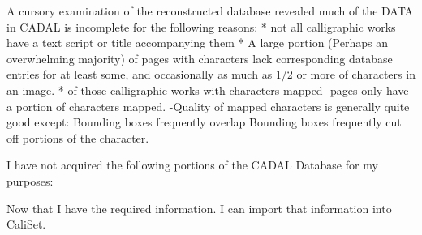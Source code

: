     A cursory examination of the reconstructed database revealed much of the DATA in CADAL is incomplete for the following reasons:
        * not all calligraphic works have a text script or title accompanying them
        * A large portion (Perhaps an overwhelming majority) of pages with characters lack corresponding database entries for at least some, and occasionally as much as 1/2 or more of characters in an image.
        * of those calligraphic works with characters mapped
            -pages only have a portion of characters mapped.
            -Quality of mapped characters is generally quite good except:
                Bounding boxes frequently overlap
                Bounding boxes frequently cut off portions of the character.                
    
    
    I have not acquired the following portions of the CADAL Database for my purposes:
    
    
    
    Now that I have the required information.  I can import that information into CaliSet.
